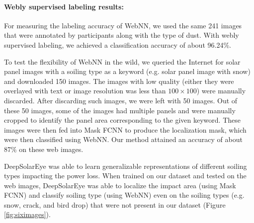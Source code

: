 \documentclass[10pt,twocolumn,letterpaper]{article}
\begin{document}
\begin{table}[t!]
  \centering
  \setlength{\belowcaptionskip}{-4mm}
  \caption{Objective assessment results}
  \label{tab:ji}
\end{table}

\vspace{-4mm}
\paragraph{Webly supervised labeling results:} For measuring the labeling accuracy of WebNN, we used the same 241 images that were annotated by participants along with the type of dust. With webly supervised labeling, we achieved a classification accuracy of about 96.24\%. 

To test the flexibility of WebNN in the wild, we queried the Internet for solar panel images with a soiling type as a keyword (e.g. solar panel image with snow) and downloaded 150 images. The images with low quality (either they were overlayed with text or image resolution was less than $100 \times 100$) were manually discarded. After discarding such images, we were left with 50 images. Out of these 50 images, some of the images had multiple panels and were manually cropped to identify the panel area corresponding to the given keyword. These images were then fed into Mask FCNN to produce the localization mask, which were then classified using WebNN. Our method attained an accuracy of about 87\% on these web images. 

DeepSolarEye was able to learn generalizable representations of different soiling types impacting the power loss. When trained on our dataset and tested on the web images, DeepSolarEye was able to localize the impact area (using Mask FCNN) and classify soiling type (using WebNN) even on the soiling types (e.g. snow, crack, and bird drop) that were not present in our dataset (Figure \ref{fig:siximages}).

\vspace{-2mm}
\end{document}
